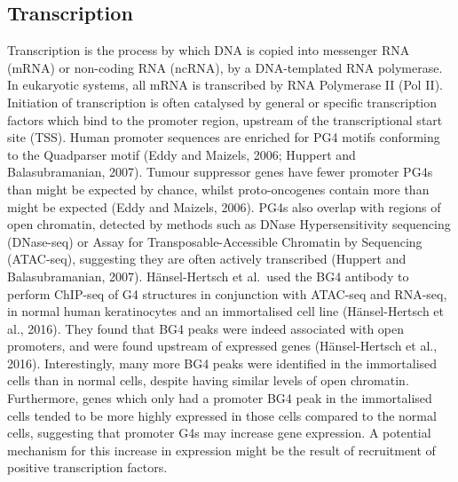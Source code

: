 \documentclass[12pt,a4paper,]{report}
\begin{document}
\newpage

\hypertarget{transcription}{%
\subsection{Transcription}\label{transcription}}

\label{ssec:transcription}

Transcription is the process by which DNA is copied into messenger RNA
(mRNA) or non-coding RNA (ncRNA), by a DNA-templated RNA polymerase. In
eukaryotic systems, all mRNA is transcribed by RNA Polymerase II (Pol
II). Initiation of transcription is often catalysed by general or
specific transcription factors which bind to the promoter region,
upstream of the transcriptional start site (TSS). Human promoter
sequences are enriched for PG4 motifs conforming to the Quadparser motif
(Eddy and Maizels, 2006; Huppert and Balasubramanian, 2007). Tumour
suppressor genes have fewer promoter PG4s than might be expected by
chance, whilst proto-oncogenes contain more than might be expected (Eddy
and Maizels, 2006). PG4s also overlap with regions of open chromatin,
detected by methods such as DNase Hypersensitivity sequencing
(DNase-seq) or Assay for Transposable-Accessible Chromatin by Sequencing
(ATAC-seq), suggesting they are often actively transcribed (Huppert and
Balasubramanian, 2007). Hänsel-Hertsch et al.~used the BG4 antibody to
perform ChIP-seq of G4 structures in conjunction with ATAC-seq and
RNA-seq, in normal human keratinocytes and an immortalised cell line
(Hänsel-Hertsch et al., 2016). They found that BG4 peaks were indeed
associated with open promoters, and were found upstream of expressed
genes (Hänsel-Hertsch et al., 2016). Interestingly, many more BG4 peaks
were identified in the immortalised cells than in normal cells, despite
having similar levels of open chromatin. Furthermore, genes which only
had a promoter BG4 peak in the immortalised cells tended to be more
highly expressed in those cells compared to the normal cells, suggesting
that promoter G4s may increase gene expression. A potential mechanism
for this increase in expression might be the result of recruitment of
positive transcription factors.
\end{document}
